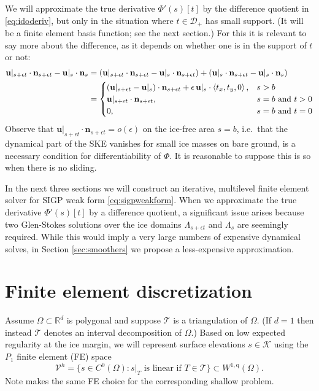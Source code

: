 \documentclass[letterpaper,final,12pt,reqno]{amsart}
\theoremstyle{claim}
\newcommand{\eps}{\epsilon}
\newcommand{\RR}{\mathbb{R}}
\newcommand{\bn}{\mathbf{n}}
\newcommand{\bu}{\mathbf{u}}
\newcommand{\qq}{{\text{q}}}
\numberwithin{equation}{section}
\numberwithin{figure}{section}
\numberwithin{table}{section}
\numberwithin{theorem}{section}
\begin{document}
We will approximate the true derivative $\Phi'(s)[t]$ by the difference quotient in \eqref{eq:idoderiv}, but only in the situation where $t \in \mathcal{D}_+$ has small support.  (It will be a finite element basis function; see the next section.)  For this it is relevant to say more about the difference, as it depends on whether one is in the support of $t$ or not:
\begin{align*}
\bu|_{s+\eps t} \cdot \bn_{s+\eps t} - \bus \cdot \bn_s &= \left(\bu|_{s+\eps t} \cdot \bn_{s+\eps t} - \bus \cdot \bn_{s+\eps t}\right) + \left(\bus \cdot \bn_{s+\eps t} - \bus \cdot \bn_s\right) \\
    &= \begin{cases}
           (\bu|_{s+\eps t} - \bus) \cdot \bn_{s+\eps t} + \eps\, \bus \cdot \left<t_x,t_y,0\right>, & s > b \\
           \bu|_{s+\eps t} \cdot \bn_{s+\eps t}, & s=b \text{ and } t > 0 \\
           0, & s=b \text{ and } t = 0
                 \end{cases}
\end{align*}
Observe that $\bu|_{s+\eps t} \cdot \bn_{s+\eps t} = o(\eps)$ on the ice-free area $s=b$, i.e.~that the dynamical part of the SKE vanishes for small ice masses on bare ground, is a necessary condition for differentiability of $\Phi$.  It is reasonable to suppose this is so when there is no sliding.

In the next three sections we will construct an iterative, multilevel finite element solver for SIGP weak form \eqref{eq:sigpweakform}.  When we approximate the true derivative $\Phi'(s)[t]$ by a difference quotient, a significant issue arises because two Glen-Stokes solutions over the ice domains $\Lambda_{s+\eps t}$ and $\Lambda_s$ are seemingly required.  While this would imply a very large numbers of expensive dynamical solves, in Section \ref{sec:smoothers} we propose a less-expensive approximation.


\section{Finite element discretization} \label{sec:fe}

Assume $\Omega \subset \RR^d$ is polygonal and suppose $\mathcal{T}$ is a triangulation of $\Omega$.  (If $d=1$ then instead $\mathcal{T}$ denotes an interval decomposition of $\Omega$.)  Based on low expected regularity at the ice margin, we will represent surface elevations $s\in \mathcal{K}$ using the $P_1$ finite element (FE) space
\begin{equation}
\mathcal{V}^h = \{s \in C^0(\Omega) : s|_T \text{ is linear if } T \in \mathcal{T}\} \subset W^{1,\qq}(\Omega).
\end{equation}
Note \cite{JouvetBueler2012} makes the same FE choice for the corresponding shallow problem.
\end{document}
